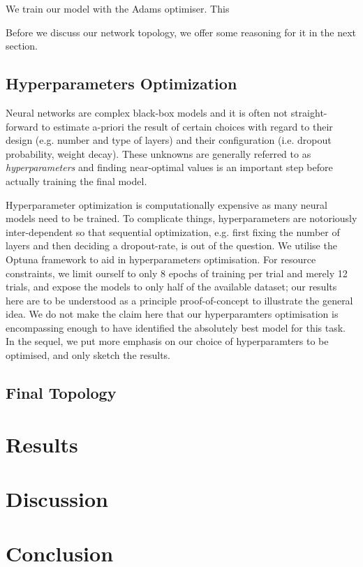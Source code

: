 \documentclass[british,12p]{article}
\begin{document}
    We train our model with the Adams optimiser. This 
    
    Before we discuss our network topology, we offer some reasoning for it in the next section.

 	
    \subsection{Hyperparameters Optimization}
    Neural networks are complex black-box models and it is often not straight-forward to estimate a-priori the result of certain choices with regard to their design (e.g. number and type of layers) and their configuration (i.e. dropout probability, weight decay). These unknowns are generally referred to as \textit{hyperparameters} and finding near-optimal values is an important step before actually training the final model.
    
    Hyperparameter optimization is computationally expensive as many neural models need to be trained. To complicate things, hyperparameters are notoriously inter-dependent so that sequential optimization, e.g. first fixing the number of layers and then deciding a dropout-rate, is out of the question. We utilise the Optuna framework to aid in hyperparameters optimisation. For resource constraints, we limit ourself to only 8 epochs of training per trial and merely 12 trials, and expose the models to only half of the available dataset; our results here are to be understood as a principle proof-of-concept to illustrate the general idea. We do not make the claim here that our hyperparamters optimisation is encompassing enough to have identified the absolutely best model for this task. In the sequel, we put more emphasis on our choice of hyperparamters to be optimised, and only sketch the results. 
    
    \subsection{Final Topology}

    \section{Results}
    \section{Discussion}
    \section{Conclusion}
           
            
      \printbibliography
    
\end{document}
